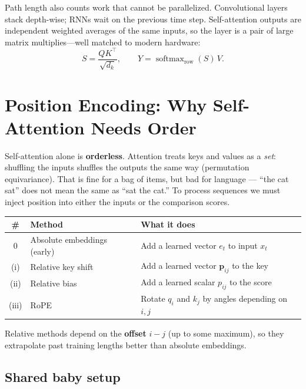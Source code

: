 \documentclass[11pt]{article}
\begin{document}
Path length also counts work that cannot be parallelized. Convolutional
layers stack depth-wise; RNNs wait on the previous time step.
Self-attention outputs are independent weighted averages of the same
inputs, so the layer is a pair of large matrix multiplies---well matched
to modern hardware:
\[
  S=\frac{QK^\top}{\sqrt{d_k}},
  \qquad
  Y=\operatorname{softmax}_{\text{row}}(S)\,V.
\]

\section{Position Encoding: Why Self-Attention Needs Order}

Self-attention alone is \textbf{orderless}. Attention treats keys and values
as a \emph{set}: shuffling the inputs shuffles the outputs the same way
(permutation equivariance). That is fine for a bag of items, but bad for
language --- ``the cat sat'' does not mean the same as ``sat the cat.''
To process sequences we must inject position into either the inputs or the
comparison scores.

\begin{center}
\begin{tabular}{@{}clp{7.2cm}@{}}
\toprule
\# & Method & What it does \\
\midrule
0 & Absolute embeddings (early)
  & Add a learned vector \(e_t\) to input \(x_t\) \\
(i) & Relative key shift
  & Add a learned vector \(\mathbf{p}_{ij}\) to the key \\
(ii) & Relative bias
  & Add a learned scalar \(p_{ij}\) to the score \\
(iii) & RoPE
  & Rotate \(q_i\) and \(k_j\) by angles depending on \(i,j\) \\
\bottomrule
\end{tabular}
\end{center}

Relative methods depend on the \textbf{offset} \(i-j\) (up to some maximum),
so they extrapolate past training lengths better than absolute embeddings.

\subsection{Shared baby setup}
\end{document}
